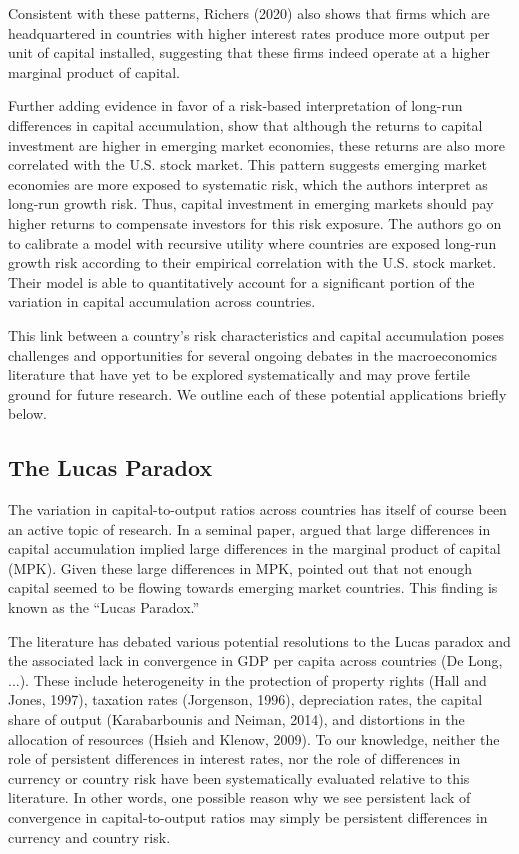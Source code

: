 \documentclass{ar-1col}
\begin{document}
Consistent with these patterns, Richers (2020) also shows that firms which are headquartered in countries with higher interest rates produce more output per unit of capital installed, suggesting that these firms indeed operate at a higher marginal product of capital. 

Further adding evidence in favor of a risk-based interpretation of long-run differences in capital accumulation, \citet{DavidHenriksenSimonovska2014} show that although the returns to capital investment are higher in emerging market economies, these returns are also more correlated with the U.S. stock market. This pattern suggests emerging market economies are more exposed to systematic risk, which the authors interpret as long-run growth risk. Thus, capital investment in emerging markets should pay higher returns to compensate investors for this risk exposure. The authors go on to calibrate a model with recursive utility where countries are exposed long-run growth risk according to their empirical correlation with the U.S. stock market. Their model is able to quantitatively account for a significant portion of the variation in capital accumulation across countries.

This link between a country's risk characteristics and capital accumulation poses challenges and opportunities for several ongoing debates in the macroeconomics literature that have yet to be explored systematically and may prove fertile ground for future research. We outline each of these potential applications briefly below.

\subsection{The Lucas Paradox}

The variation in capital-to-output ratios across countries has itself of course been an active topic of research. In a seminal paper, \citet{Lucas1990} argued that large differences in capital accumulation implied large differences in the marginal product of capital (MPK). Given these large differences in MPK, \citet{Lucas1990} pointed out that not enough capital seemed to be flowing towards emerging market countries. This finding is known as the ``Lucas Paradox.''

The literature has debated various potential resolutions to the Lucas paradox and the associated lack in convergence in GDP per capita across countries (De Long, ...). These include heterogeneity
in the protection of property rights (Hall and Jones, 1997), taxation rates (Jorgenson,
1996), depreciation rates, the capital share of output (Karabarbounis and Neiman, 2014),
and distortions in the allocation of resources (Hsieh and Klenow, 2009). To our knowledge, neither the role of persistent differences in interest rates, nor the role of differences in currency or country risk have been systematically evaluated relative to this literature. In other words, one possible reason why we see persistent lack of convergence in capital-to-output ratios may simply be persistent differences in currency and country risk. 
\end{document}
